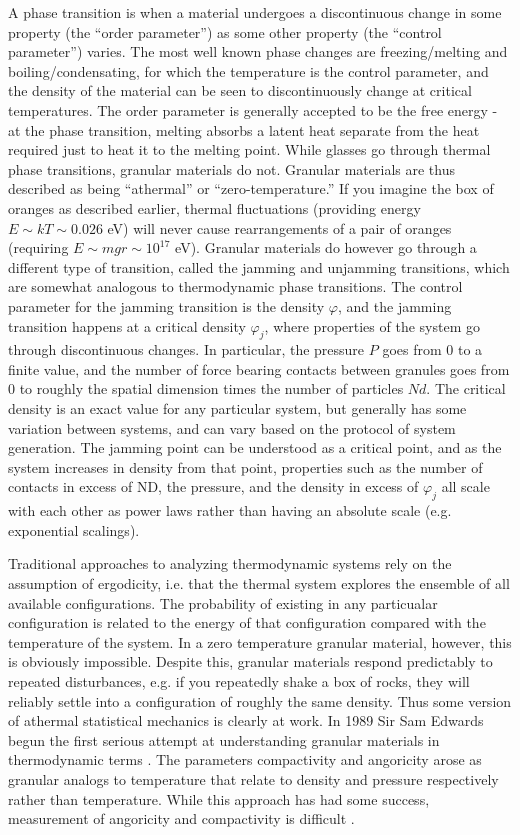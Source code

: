 A phase transition is when a material undergoes a discontinuous change in some property (the ``order parameter'') as some other property (the ``control parameter'') varies. The most well known phase changes are freezing/melting and boiling/condensating, for which the temperature is the control parameter, and the density of the material can be seen to discontinuously change at critical temperatures. The order parameter is generally accepted to be the free energy - at the phase transition, melting absorbs a latent heat separate from the heat required just to heat it to the melting point. While glasses go through thermal phase transitions, granular materials do not. Granular materials are thus described as being ``athermal'' or ``zero-temperature.'' If you imagine the box of oranges as described earlier, thermal fluctuations (providing energy $E \sim kT \sim 0.026$ eV) will never cause rearrangements of a pair of oranges (requiring $E \sim mgr \sim 10^{17}$ eV). Granular materials do however go through a different type of transition, called the jamming and unjamming transitions, which are somewhat analogous to thermodynamic phase transitions. The control parameter for the jamming transition is the density $\varphi$, and the jamming transition happens at a critical density $\varphi_j$, where properties of the system go through discontinuous changes. In particular, the pressure $P$ goes from 0 to a finite value, and the number of force bearing contacts between granules goes from 0 to roughly the spatial dimension times the number of particles $Nd$. The critical density is an exact value for any particular system, but generally has some variation between systems, and can vary based on the protocol of system generation. The jamming point can be understood as a critical point, and as the system increases in density from that point, properties such as the number of contacts in excess of ND, the pressure, and the density in excess of $\varphi_j$ all scale with each other as power laws rather than having an absolute scale (e.g. exponential scalings).

Traditional approaches to analyzing thermodynamic systems rely on the assumption of ergodicity, i.e. that the thermal system explores the ensemble of all available configurations. The probability of existing in any particualar configuration is related to the energy of that configuration compared with the temperature of the system. In a zero temperature granular material, however, this is obviously impossible. Despite this, granular materials respond predictably to repeated disturbances, e.g. if you repeatedly shake a box of rocks, they will reliably settle into a configuration of roughly the same density. Thus some version of athermal statistical mechanics is clearly at work. In 1989 Sir Sam Edwards begun the first serious attempt at understanding granular materials in thermodynamic terms \cite{edwards_theory_1989}. The parameters compactivity and angoricity arose as granular analogs to temperature that relate to density and pressure respectively rather than temperature. While this approach has had some success, measurement of angoricity and compactivity is difficult  \cite{bi_statistical_2015}.

